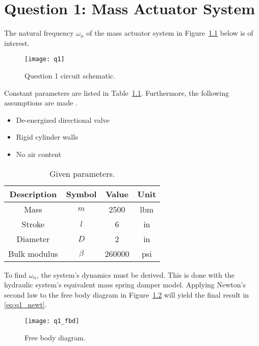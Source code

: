 \chapter{Question 1: Mass Actuator System}
\label{chap:q1}

The natural frequency $\omega_n$ of the mass actuator system in Figure~\ref{fig:q1} \cite{assign} below is of interest.

\begin{figure}[H]
	\centering
	\texttt{[image: q1]}
	\caption{Question 1 circuit schematic.}
	\label{fig:q1}
\end{figure}

Constant parameters are listed in Table~\ref{tab:q1_param}. Furthermore, the following assumptions are made \cite{assign}.
\begin{itemize}
\item De-energized directional valve
\item Rigid cylinder walls
\item No air content
\end{itemize}

\begin{table}[H]
  \centering
  \caption{Given parameters.}
    \begin{tabular}{cccc}
    \toprule
    \textbf{Description} & \textbf{Symbol} & \textbf{Value } & \textbf{Unit} \\
    \midrule
    Mass  & $m$   & 2500  & lbm \\
    Stroke & $l$   & 6     & in \\
    Diameter & $D$   & 2     & in \\
    Bulk modulus & $\beta$ & 260000 & psi \\
    \bottomrule    
    \end{tabular}
  \label{tab:q1_param}
\end{table}

To find $\omega_n$, the system's dynamics must be derived. This is done with the hydraulic system's equivalent mass spring damper model. Applying Newton's second law to the free body diagram in Figure~\ref{fig:q1_fbd} will yield the final result in \ref{eq:q1_newt}.

\begin{figure}[H]
	\centering
	\texttt{[image: q1\_fbd]}
	\caption{Free body diagram.}
	\label{fig:q1_fbd}
\end{figure}


